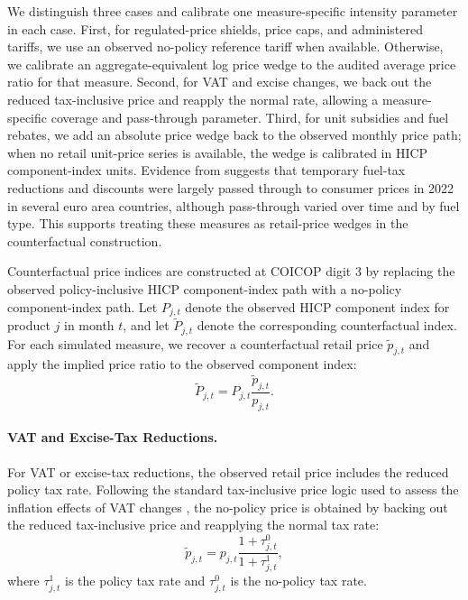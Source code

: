 \documentclass[11pt]{article}
\begin{document}
We distinguish three cases and calibrate one measure-specific intensity parameter in each case.
First, for regulated-price shields, price caps, and administered tariffs, we use an observed
no-policy reference tariff when available. Otherwise, we calibrate an aggregate-equivalent
log price wedge to the audited average price ratio for that measure. Second, for VAT and excise
changes, we back out the reduced tax-inclusive price and reapply the normal rate, allowing a
measure-specific coverage and pass-through parameter. Third, for unit subsidies and fuel rebates,
we add an absolute price wedge back to the observed monthly price path; when no retail unit-price
series is available, the wedge is calibrated in HICP component-index units. Evidence from
\citet{drolsbach2023pass} suggests that temporary fuel-tax reductions and discounts were largely
passed through to consumer prices in 2022 in several euro area countries, although pass-through
varied over time and by fuel type. This supports treating these measures as retail-price wedges in
the counterfactual construction.

Counterfactual price indices are constructed at COICOP digit 3 by replacing the observed
policy-inclusive HICP component-index path with a no-policy component-index path. Let $P_{j,t}$
denote the observed HICP component index for product $j$ in month $t$, and let $\widetilde P_{j,t}$
denote the corresponding counterfactual index. For each simulated measure, we recover a
counterfactual retail price $\widetilde p_{j,t}$ and apply the implied price ratio to the observed
component index:
\begin{equation}
\widetilde P_{j,t}
=
P_{j,t}
\frac{\widetilde p_{j,t}}{p_{j,t}} .
\end{equation}

\paragraph{VAT and Excise-Tax Reductions.}
For VAT or excise-tax reductions, the observed retail price includes the reduced policy tax rate.
Following the standard tax-inclusive price logic used to assess the inflation effects of VAT changes
\citep{gautier2013vat}, the no-policy price is obtained by backing out the reduced tax-inclusive
price and reapplying the normal tax rate:
\begin{equation}
\widetilde p_{j,t}
=
p_{j,t}
\frac{1+\tau^{0}_{j,t}}{1+\tau^{1}_{j,t}},
\end{equation}
where $\tau^{1}_{j,t}$ is the policy tax rate and $\tau^{0}_{j,t}$ is the no-policy tax rate.
\end{document}
